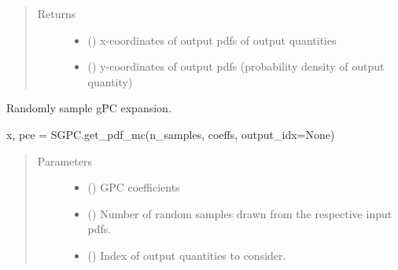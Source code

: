 \documentclass[letterpaper,10pt,english,openany,oneside]{sphinxmanual}
\begin{document}
\begin{fulllineitems}
\begin{fulllineitems}
\begin{quote}
\begin{description}
\begin{itemize}
\end{itemize}

\item[{Returns}] \leavevmode
\begin{itemize}
\item {} 
 () \textendash{} x-coordinates of output pdfs of output quantities

\item {} 
 () \textendash{} y-coordinates of output pdfs (probability density of output quantity)

\end{itemize}


\end{description}\end{quote}

\end{fulllineitems}


\begin{fulllineitems}
\label{\detokenize{pygpc:pygpc.GPC.GPC.get_samples}}
Randomly sample gPC expansion.

x, pce = SGPC.get\_pdf\_mc(n\_samples, coeffs, output\_idx=None)
\begin{quote}\begin{description}
\item[{Parameters}] \leavevmode\begin{itemize}
\item {} 
 (\sphinxstyleliteralemphasis{\sphinxupquote{ {[}}}\sphinxstyleliteralemphasis{\sphinxupquote{{]}}}) \textendash{} GPC coefficients

\item {} 
 () \textendash{} Number of random samples drawn from the respective input pdfs.

\item {} 
 (\sphinxstyleliteralemphasis{\sphinxupquote{ {[}}}\sphinxstyleliteralemphasis{\sphinxupquote{{]} }}\sphinxstyleliteralemphasis{\sphinxupquote{, }}) \textendash{} Index of output quantities to consider.


\end{itemize}
\end{description}
\end{quote}
\end{fulllineitems}
\end{fulllineitems}
\end{document}
